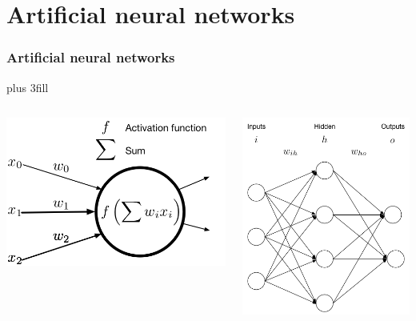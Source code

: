 \section{Artificial neural networks}
\begin{frame}[fragile]\frametitle{Artificial neural networks}
\vskip0pt plus 3fill
\begin{columns}
\begin{column}{0.5\textwidth}
\includegraphics[width=\linewidth]{neuron.png}
\end{column}
\vrule
\begin{column}{0.5\textwidth}
\includegraphics[width=\linewidth]{ann.png}
\end{column}
\end{columns}
\end{frame}

